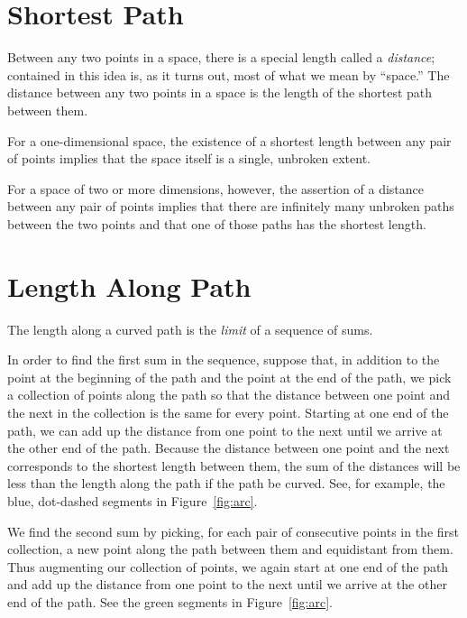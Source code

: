 \section{Shortest Path}

Between any two points in a space, there is a special length called a
\emph{distance}; contained in this idea is, as it turns out, most of what we
mean by ``space.'' The distance between any two points in a space is the length
of the shortest path between them.

For a one-dimensional space, the existence of a shortest length between any
pair of points implies that the space itself is a single, unbroken extent.

For a space of two or more dimensions, however, the assertion of a distance
between any pair of points implies that there are infinitely many unbroken
paths between the two points and that one of those paths has the shortest
length.

\section{Length Along Path}

The length along a curved path is the \emph{limit} of a sequence of sums.

In order to find the first sum in the sequence, suppose that, in addition to
the point at the beginning of the path and the point at the end of the path, we
pick a collection of points along the path so that the distance between one
point and the next in the collection is the same for every point.  Starting at
one end of the path, we can add up the distance from one point to the next
until we arrive at the other end of the path.  Because the distance between one
point and the next corresponds to the shortest length between them, the sum of
the distances will be less than the length along the path if the path be
curved.  See, for example, the blue, dot-dashed segments in
Figure~\ref{fig:arc}.

We find the second sum by picking, for each pair of consecutive points in the
first collection, a new point along the path between them and equidistant from
them.  Thus augmenting our collection of points, we again start at one end of
the path and add up the distance from one point to the next until we arrive at
the other end of the path.  See the green segments in Figure~\ref{fig:arc}.

